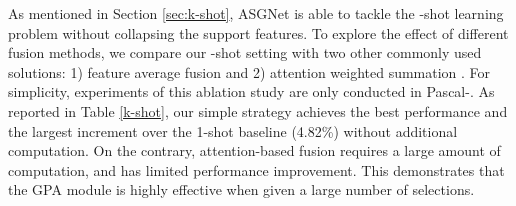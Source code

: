 \begin{table}[htbp]
\begin{center}
\end{center}
\caption{Ablation study on prototype generation (Masked average pooling (MAP) vs. SGC) and matching (Expand vs. GPA). FLOPs denotes the computational cost from prototype matching process, and K is the adaptive number of prototype (K).}
\label{methods_ablation}
\end{table}

\vspace{1mm}
As mentioned in Section \ref{sec:k-shot}, ASGNet is able to tackle the -shot learning problem without collapsing the support features.
To explore the effect of different fusion methods, we compare our -shot setting with two other commonly used solutions: 1) feature average fusion \cite{co-fcn} and 2) attention weighted summation \cite{canet}. 
For simplicity, experiments of this ablation study are only conducted in Pascal-.
As reported in Table \ref{k-shot}, our simple strategy achieves the best performance and the largest increment over the 1-shot baseline (4.82\%) without additional computation.
On the contrary, attention-based fusion requires a large amount of computation, and has limited performance improvement.
This demonstrates that the GPA module is highly effective when given a large number of selections.


